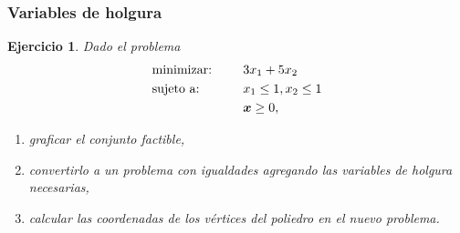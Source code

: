 \documentclass[aspectratio=169,12pt,spanish]{beamer}
\newtheorem{ejercicio}{Ejercicio}
\begin{document}
\begin{frame}
\frametitle{Variables de holgura}

\begin{ejercicio}
Dado el problema
\begin{alignat*}{2}
  & \text{minimizar: } & & 3 x_1 + 5 x_2 \\
   & \text{sujeto a: } & \quad & x_1 \le 1, x_2 \le 1 \\
   & & & \bm{x} \ge 0,
\end{alignat*}
\begin{enumerate}
\item graficar el conjunto factible,
\item convertirlo a un problema con igualdades agregando las variables de holgura necesarias,
\item calcular las coordenadas de los vértices del poliedro en el nuevo problema.
\end{enumerate}
\end{ejercicio}

\end{frame}
\end{document}
